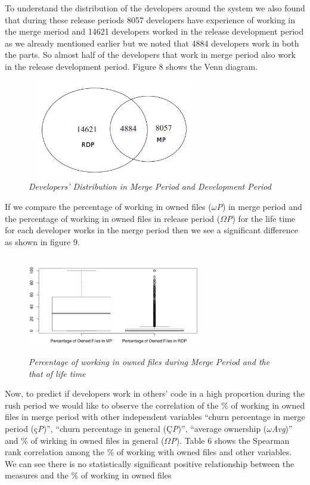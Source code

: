 \documentclass{acm_proc_article-sp}
\begin{document}
To understand the distribution of the developers around the system we also found that during these release periods 8057 developers have experience of working in the merge meriod and 14621 developers worked in the release development period as we already mentioned earlier but we noted that 4884 developers work in both the parts. So almost half of the developers that work in merge period also work in the release development period. Figure 8 shows the Venn diagram.
\begin{figure}
\begin{center}
\includegraphics[height=1.7in,width=3in]{devDistMPRDP.png}
\caption{\small \sl Developers' Distribution in Merge Period and Development Period}
\end{center}
\end{figure}

If we compare the percentage of working in owned files ($\omega$\textit{P}) in merge period and the percentage of working in owned files in release period ($\Omega$\textit{P}) for the life time for each developer works in the merge period then we see a significant difference as shown in figure 9.
\begin{figure}
\begin{center}
\includegraphics[height=1.7in,width=3in]{ownedFilesMPRDPBox.png}
\caption{\small \sl Percentage of working in owned files during Merge Period and the that of life time}
\end{center}
\end{figure}

Now, to predict if developers work in others' code in a high proportion during the rush period we would like to observe the correlation of the \% of working in owned files in merge period with other independent variables ``churn percentage in merge period (\c{c}\textit{P})'', ``churn percentage in general (\c{C}\textit{P})'', ``average ownership ($\omega$\textit{Avg})'' and \% of wirking in owned files in general ($\Omega$\textit{P}). Table 6 shows the Spearman rank correlation among the \% of working with owned files and other variables. We can see there is no statistically significant positive relationship between the measures and the \% of working in owned files 
\end{document}
